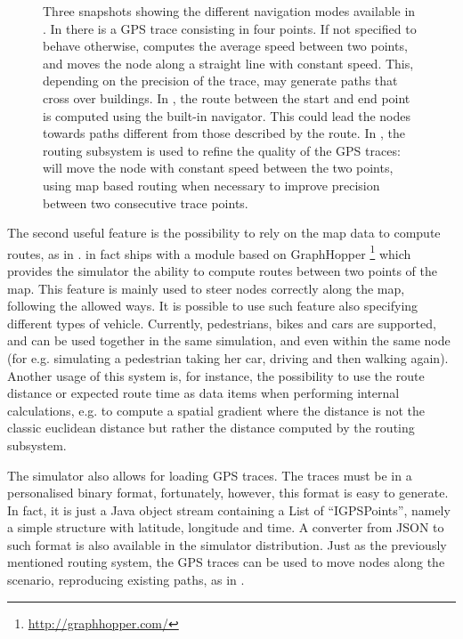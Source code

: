 \documentclass[12pt,a4paper,twoside,openright]{book}
\begin{document}
\begin{figure}
{   \label{img:mixed-alchemist-navi}
  }
 \caption[Navigation modes in \alchemist{}]{Three snapshots showing the different navigation modes available in \alchemist{}. In  there is a GPS trace consisting in four points. If not specified to behave otherwise, \alchemist{} computes the average speed between two points, and moves the node along a straight line with constant speed. This, depending on the precision of the trace, may generate paths that cross over buildings. In , the route between the start and end point is computed using the built-in navigator. This could lead the nodes towards paths different from those described by the route. In , the routing subsystem is used to refine the quality of the GPS traces: \alchemist{} will move the node with constant speed between the two points, using map based routing when necessary to improve precision between two consecutive trace points.}
 \label{img:traces-navigation}
\end{figure}

The second useful feature is the possibility to rely on the map data to compute routes, as in .
%
\alchemist{} in fact ships with a module based on GraphHopper \footnote{\url{http://graphhopper.com/}} which provides the simulator the ability to compute routes between two points of the map.
%
This feature is mainly used to steer nodes correctly along the map, following the allowed ways.
%
It is possible to use such feature also specifying different types of vehicle.
%
Currently, pedestrians, bikes and cars are supported, and can be used together in the same simulation, and even within the same node (for e.g. simulating a pedestrian taking her car, driving and then walking again).
%
Another usage of this system is, for instance, the possibility to use the route distance or expected route time as data items when performing internal calculations, e.g. to compute a spatial gradient where the distance is not the classic euclidean distance but rather the distance computed by the routing subsystem.

The simulator also allows for loading GPS traces.
%
The traces must be in a personalised binary format, fortunately, however, this format is easy to generate.
%
In fact, it is just a Java object stream containing a List of ``IGPSPoints'', namely a simple structure with latitude, longitude and time.
%
A converter from JSON to such format is also available in the simulator distribution.
%
Just as the previously mentioned routing system, the GPS traces can be used to move nodes along the scenario, reproducing existing paths, as in .
\end{document}
